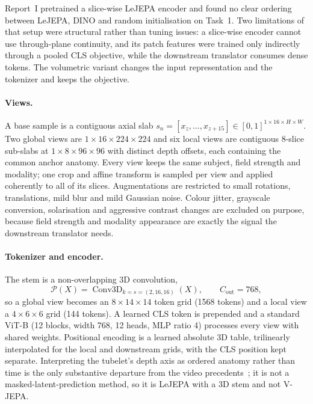 \documentclass[11pt,a4paper]{article}
\newcommand{\reportone}{Report~I}
\begin{document}
\reportone{} pretrained a slice-wise LeJEPA encoder and found no clear ordering between LeJEPA, DINO and
random initialisation on Task~1. Two limitations of that setup were structural rather than tuning issues:
a slice-wise encoder cannot use through-plane continuity, and its patch features were trained only
indirectly through a pooled CLS objective, while the downstream translator consumes dense tokens. The
volumetric variant changes the input representation and the tokenizer and keeps the objective.

\paragraph{Views.} A base sample is a contiguous axial slab
$s_n = [x_z, \dots, x_{z+15}] \in [0,1]^{1\times16\times H\times W}$. Two global views are
$1\times16\times224\times224$ and six local views are contiguous 8-slice sub-slabs at
$1\times8\times96\times96$ with distinct depth offsets, each containing the common anchor anatomy.
Every view keeps the same subject, field strength and modality; one crop and affine transform is sampled
per view and applied coherently to all of its slices. Augmentations are restricted to small rotations,
translations, mild blur and mild Gaussian noise. Colour jitter, grayscale conversion, solarisation and
aggressive contrast changes are excluded on purpose, because field strength and modality appearance are
exactly the signal the downstream translator needs.

\paragraph{Tokenizer and encoder.} The stem is a non-overlapping 3D convolution,
\begin{equation}
  \mathcal{P}(X) = \operatorname{Conv3D}_{k = s = (2,16,16)}(X),
  \qquad C_{\text{out}} = 768,
\end{equation}
so a global view becomes an $8\times14\times14$ token grid (1568 tokens) and a local view a
$4\times6\times6$ grid (144 tokens). A learned CLS token is prepended and a standard ViT-B (12 blocks, width 768, 12 heads, MLP ratio
4) processes every view with shared weights. Positional encoding is a learned absolute 3D table,
trilinearly interpolated for the local and downstream grids, with the CLS position kept separate.
Interpreting the tubelet's depth axis as ordered anatomy rather than time is the only substantive
departure from the video precedents~\cite{avjepa,vjepa,videomae}; it is not a masked-latent-prediction
method, so it is LeJEPA with a 3D stem and not V-JEPA.
\end{document}

